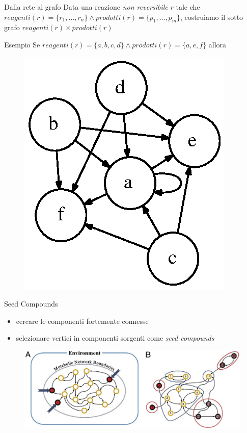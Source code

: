 \documentclass{beamer}
\begin{document}
\begin{frame}{Dalla rete al grafo}
  Data una reazione \emph{non reversibile} $r$ tale che $reagenti(r) =
  \{ r_{1}, \ldots, r_{n} \} \wedge prodotti(r) = \{ p_{1}, \ldots,
  p_{m} \}$, costruiamo il sotto grafo $reagenti(r) \times
  prodotti(r)$
    \begin{block}{Esempio}
      Se $reagenti(r) = \{ a, b, c, d \} \wedge prodotti(r) = \{a, e,
      f\}$ allora
      \begin{figure}
        \centering
        \includegraphics[scale=.6]{images/non-reversible-reaction-example.dot.eps}
        \label{fig:non-reversible-reaction-mapping}
      \end{figure}
    \end{block}
\end{frame}

\begin{frame}{Seed Compounds}
  \begin{itemize}
  \item cercare le componenti fortemente connesse
  \item selezionare vertici in componenti sorgenti come \emph{seed
      compounds}
  \end{itemize}
  \begin{figure}
    \includegraphics[scale=.35]{images/biology-scc-decomposition.eps}
  \end{figure}

\end{frame}
\end{document}
